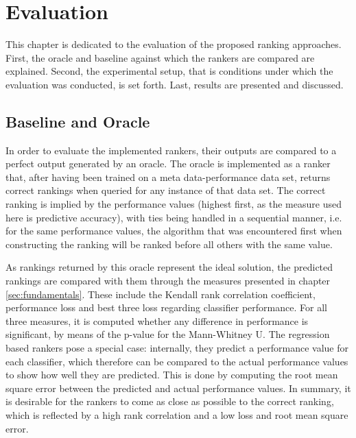 \chapter{Evaluation}
\label{sec:evaluation}

This chapter is dedicated to the evaluation of the proposed ranking approaches. First, the oracle and baseline against which the rankers are compared are explained. Second, the experimental setup, that is conditions under which the evaluation was conducted, is set forth. Last, results are presented and discussed.

\section{Baseline and Oracle}
In order to evaluate the implemented rankers, their outputs are compared to a perfect output generated by an oracle. The oracle is implemented as a ranker that, after having been trained on a meta data-performance data set, returns correct rankings when queried for any instance of that data set. The correct ranking is implied by the performance values (highest first, as the measure used here is predictive accuracy), with ties being handled in a sequential manner, i.e. for the same performance values, the algorithm that was encountered first when constructing the ranking will be ranked before all others with the same value.

As rankings returned by this oracle represent the ideal solution, the predicted rankings are compared with them through the measures presented in chapter \ref{sec:fundamentals}. These include the Kendall rank correlation coefficient, performance loss and best three loss regarding classifier performance. For all three measures, it is computed whether any difference in performance is significant, by means of the p-value for the Mann-Whitney U. The regression based rankers pose a special case: internally, they predict a performance value for each classifier, which therefore can be compared to the actual performance values to show how well they are predicted. This is done by computing the root mean square error between the predicted and actual performance values. In summary, it is desirable for the rankers to come as close as possible to the correct ranking, which is reflected by a high rank correlation and a low loss and root mean square error.


